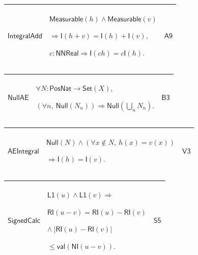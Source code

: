 \documentclass[11pt]{amsart}
\newlength{\FTCThreeColumnBody}
\begin{document}
{\noindent
\begin{tabular}{|@{}>{\centering\arraybackslash}m{0.251968\FTCThreeColumnBody}|>{\centering\arraybackslash}m{0.590551\FTCThreeColumnBody}|>{\centering\arraybackslash}m{0.157480\FTCThreeColumnBody}|}\hline
\hypertarget{dctlem:IntegralAdd}{$\displaystyle \textsf{IntegralAdd}$} & $\displaystyle \textsf{Measurable}(h)\land\textsf{Measurable}(v)$\par
$\displaystyle \Rightarrow\textsf{I}(h+v)=\textsf{I}(h)+\textsf{I}(v),$\par
$\displaystyle c:\textsf{NNReal}\Rightarrow\textsf{I}(ch)=c\textsf{I}(h).$ & \hyperlink{dct:A9}{$\displaystyle \textsf{A9}$}\\ \hline
\end{tabular}%
\par\setlength{\parskip}{0pt}\nointerlineskip
\noindent
\begin{tabular}{|@{}>{\centering\arraybackslash}m{0.251968\FTCThreeColumnBody}|>{\centering\arraybackslash}m{0.590551\FTCThreeColumnBody}|>{\centering\arraybackslash}m{0.157480\FTCThreeColumnBody}|}\hline
\hypertarget{dctlem:NullAE}{$\displaystyle \textsf{NullAE}$} & $\displaystyle \forall N:\textsf{PosNat}\to\textsf{Set}(X),$\par
$\displaystyle (\forall n,\ \textsf{Null}(N_n))\Rightarrow\textsf{Null}(\bigcup_n N_n).$ & \hyperlink{dct:B3}{$\displaystyle \textsf{B3}$}\\ \hline
\end{tabular}%
\par\setlength{\parskip}{0pt}\nointerlineskip
\noindent
\begin{tabular}{|@{}>{\centering\arraybackslash}m{0.251968\FTCThreeColumnBody}|>{\centering\arraybackslash}m{0.590551\FTCThreeColumnBody}|>{\centering\arraybackslash}m{0.157480\FTCThreeColumnBody}|}\hline
\hypertarget{dctlem:AEIntegral}{$\displaystyle \textsf{AEIntegral}$} & $\displaystyle \textsf{Null}(N)\land(\forall x\notin N,\ h(x)=v(x))$\par
$\displaystyle \Rightarrow\textsf{I}(h)=\textsf{I}(v).$ & \hyperlink{dct:V3}{$\displaystyle \textsf{V3}$}\\ \hline
\end{tabular}%
\par\setlength{\parskip}{0pt}\nointerlineskip
\noindent
\begin{tabular}{|@{}>{\centering\arraybackslash}m{0.251968\FTCThreeColumnBody}|>{\centering\arraybackslash}m{0.590551\FTCThreeColumnBody}|>{\centering\arraybackslash}m{0.157480\FTCThreeColumnBody}|}\hline
\hypertarget{dctlem:SignedCalc}{$\displaystyle \textsf{SignedCalc}$} & $\displaystyle \textsf{L1}(u)\land\textsf{L1}(v)\Rightarrow$\par
$\displaystyle \textsf{RI}(u-v)=\textsf{RI}(u)-\textsf{RI}(v)$\par
$\displaystyle \land\ |\textsf{RI}(u)-\textsf{RI}(v)|$\par
$\displaystyle {}\le\textsf{val}(\textsf{NI}(u-v)).$ & \hyperlink{dct:S5}{$\displaystyle \textsf{S5}$}\\ \hline
\end{tabular}%
\par
}
\end{document}
